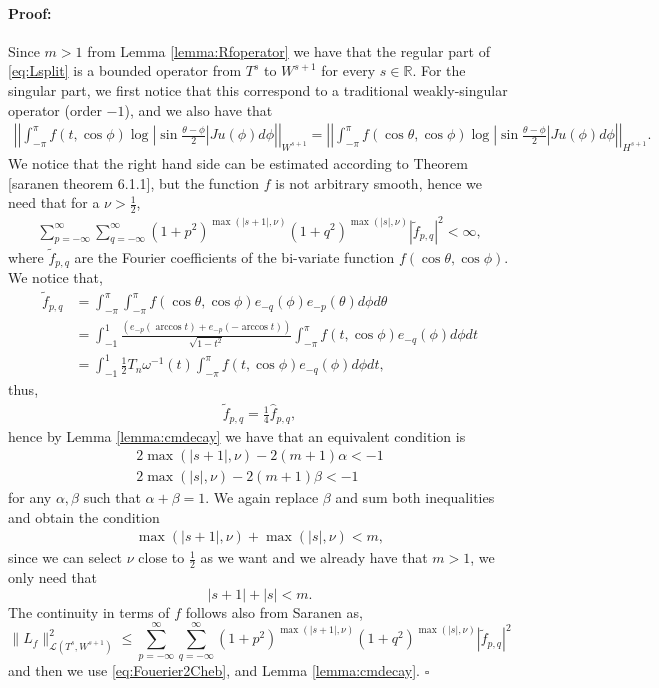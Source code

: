 \documentclass{article}
\newenvironment{proof}{\paragraph{Proof:}}{\hfill$\square$}
\newcommand{\todo}[1]{{\color{red}[#1]}}
\newcommand{\IR}{{\mathbb R}}
\begin{document}
\begin{proof}
Since $m>1$ from Lemma \ref{lemma:Rfoperator} we have that the regular part of \eqref{eq:Lsplit} is a bounded operator from $T^s$ to $W^{s+1}$ for every $s \in \IR$. For the singular part, we first notice that this correspond to a traditional weakly-singular operator (order $-1$), and we also have that 
\begin{align*}
\left\vert \left \vert \int_{-\pi}^{\pi} f(t,\cos \phi) \log \left\vert \sin \frac{\theta-\phi}{2} \right\vert Ju(\phi) d\phi \right\vert\right\vert_{W^{s+1}} = 
\left\vert \left \vert \int_{-\pi}^{\pi} f(\cos \theta,\cos \phi) \log \left\vert \sin \frac{\theta-\phi}{2} \right\vert Ju(\phi) d\phi \right\vert\right\vert_{H^{s+1}}.
\end{align*}
We notice that the right hand side can be estimated according to Theorem \todo{saranen theorem 6.1.1}, but the function $f$ is not arbitrary smooth, hence we need that for a $\nu >\frac{1}{2}$,
\begin{align*}
\sum_{p=-\infty}^{\infty} \sum_{q = -\infty}^\infty (1+p^2)^{\max(|s+1|,\nu)}(1+q^2)^{\max(|s|,\nu)} | \widetilde{f}_{p,q}|^2 < \infty,
\end{align*}
where $\widetilde{f}_{p,q}$ are the Fourier coefficients of the bi-variate function $f(\cos \theta, \cos \phi)$. We notice that, 
\begin{align*}
\widetilde{f}_{p,q} &= \int_{-\pi}^\pi \int_{-\pi} ^\pi f(\cos \theta, \cos \phi)  e_{-q}(\phi) e_{-p}(\theta) d\phi d\theta\\
&= \int_{-1}^{1} \frac{(e_{-p}(\arccos t)+e_{-p}(-\arccos t))}{\sqrt{1-t^2}} \int_{-\pi} ^\pi f(t, \cos \phi)  e_{-q}(\phi) d\phi dt \\
&= \int_{-1}^{1} \frac{1}{2}T_n\omega^{-1}(t) \int_{-\pi} ^\pi f(t, \cos \phi)  e_{-q}(\phi) d\phi dt,
\end{align*}
thus, 
\begin{align}
\label{eq:Fouerier2Cheb}
\widetilde{f}_{p,q} = \frac{1}{4} \widehat{f}_{p,q},
\end{align}
 hence by Lemma \ref{lemma:cmdecay}  we have that an equivalent condition is 
\begin{align*}
2 \max(|s+1|, \nu ) - 2(m+1) \alpha < -1 \\ 
2 \max(|s|, \nu ) - 2(m+1) \beta < -1 
\end{align*}
for any $\alpha, \beta$ such that $\alpha + \beta =1$. We again replace $\beta$ and sum both inequalities and obtain the condition 
\begin{align*}
\max(|s+1|, \nu ) +\max(|s|, \nu )  < m ,
\end{align*}
since we can select $\nu$ close to $\frac{1}{2}$ as we want and we already have that $m > 1$, we only need that 
$$|s+1| + |s| < m. $$
The continuity in terms of $f$ follows also from Saranen as,
$$\|L_f\|^2_{\mathcal{L}(T^s,W^{s+1})} \leq \sum_{p=-\infty}^{\infty} \sum_{q = -\infty}^\infty (1+p^2)^{\max(|s+1|,\nu)}(1+q^2)^{\max(|s|,\nu)} | \widetilde{f}_{p,q}|^2$$
and then we use \eqref{eq:Fouerier2Cheb}, and Lemma \ref{lemma:cmdecay}.
\end{proof}
\end{document}
